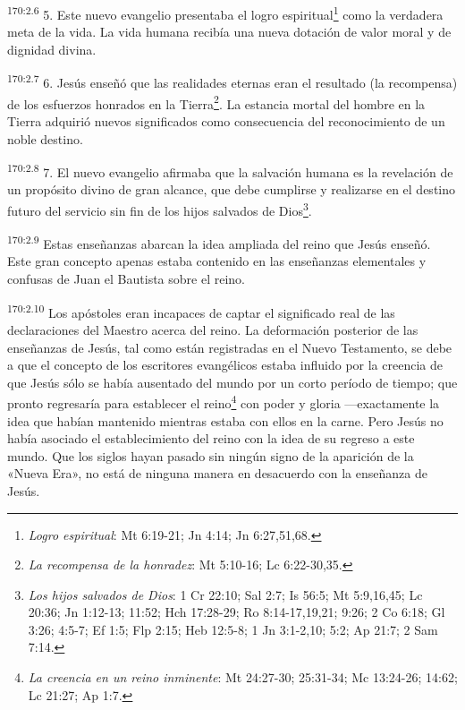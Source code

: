 \par
\textsuperscript{170:2.6} 5. Este nuevo evangelio presentaba el logro espiritual\footnote{\textit{Logro espiritual}: Mt 6:19-21; Jn 4:14; Jn 6:27,51,68.} como la verdadera meta de la vida. La vida humana recibía una nueva dotación de valor moral y de dignidad divina.

\par
\textsuperscript{170:2.7} 6. Jesús enseñó que las realidades eternas eran el resultado (la recompensa) de los esfuerzos honrados en la Tierra\footnote{\textit{La recompensa de la honradez}: Mt 5:10-16; Lc 6:22-30,35.}. La estancia mortal del hombre en la Tierra adquirió nuevos significados como consecuencia del reconocimiento de un noble destino.

\par
\textsuperscript{170:2.8} 7. El nuevo evangelio afirmaba que la salvación humana es la revelación de un propósito divino de gran alcance, que debe cumplirse y realizarse en el destino futuro del servicio sin fin de los hijos salvados de Dios\footnote{\textit{Los hijos salvados de Dios}: 1 Cr 22:10; Sal 2:7; Is 56:5; Mt 5:9,16,45; Lc 20:36; Jn 1:12-13; 11:52; Hch 17:28-29; Ro 8:14-17,19,21; 9:26; 2 Co 6:18; Gl 3:26; 4:5-7; Ef 1:5; Flp 2:15; Heb 12:5-8; 1 Jn 3:1-2,10; 5:2; Ap 21:7; 2 Sam 7:14.}.

\par
\textsuperscript{170:2.9} Estas enseñanzas abarcan la idea ampliada del reino que Jesús enseñó. Este gran concepto apenas estaba contenido en las enseñanzas elementales y confusas de Juan el Bautista sobre el reino.

\par
\textsuperscript{170:2.10} Los apóstoles eran incapaces de captar el significado real de las declaraciones del Maestro acerca del reino. La deformación posterior de las enseñanzas de Jesús, tal como están registradas en el Nuevo Testamento, se debe a que el concepto de los escritores evangélicos estaba influido por la creencia de que Jesús sólo se había ausentado del mundo por un corto período de tiempo; que pronto regresaría para establecer el reino\footnote{\textit{La creencia en un reino inminente}: Mt 24:27-30; 25:31-34; Mc 13:24-26; 14:62; Lc 21:27; Ap 1:7.} con poder y gloria ---exactamente la idea que habían mantenido mientras estaba con ellos en la carne. Pero Jesús no había asociado el establecimiento del reino con la idea de su regreso a este mundo. Que los siglos hayan pasado sin ningún signo de la aparición de la «Nueva Era», no está de ninguna manera en desacuerdo con la enseñanza de Jesús.

